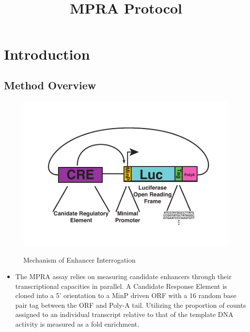 \documentclass[a4paper]{article}
\title{MPRA Protocol}
\begin{document}
\maketitle

\newpage
\tableofcontents
\newpage

\section{Introduction}
	
    \subsection{Method Overview}
    	\begin{figure}[H]
			\centering
			\includegraphics[width=1.0\textwidth]{MPRA_Basic_Fig.pdf}
			\label{fig:Mechanism}
			\caption{Mechanism of Enhancer Interrogation}
        \end{figure}
        \begin{itemize}
                
            \item The MPRA assay relies on measuring candidate enhancers through their transcriptional capacities in parallel. A Candidate Response Element is cloned into a 5' orientation to a MinP driven ORF with a 16 random base pair tag between the ORF and Poly-A tail. Utilizing the proportion of counts assigned to an individual transcript relative to that of the template DNA activity is measured as a fold enrichment.
                              
    	\end{itemize}
\end{document}
